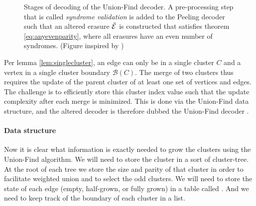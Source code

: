 \begin{figure}[]
  \centering
  \caption{Stages of decoding of the Union-Find decoder. A pre-processing step that is called \emph{syndrome validation} is added to the Peeling decoder such that an altered erasure $\bar{\mathcal{E}}$ is constructed that satisfies theorem \ref{eq:anyevenparity}, where all erasures have an even number of syndromes. (Figure inspired by \cite{delfosse2017almost})} 
  \label{fig:ufstages}
\end{figure}
Per lemma \ref{lem:singlecluster}, an edge can only be in a single cluster $C$ and a vertex in a single cluster boundary $\mathscr{B}(C)$. The merge of two clusters thus requires the update of the parent cluster of at least one set of vertices and edges. The challenge is to efficiently store this cluster index value such that the update complexity after each merge is minimized. This is done via the Union-Find data structure, and the altered decoder is therefore dubbed the Union-Find decoder \cite{delfosse2017almost}.

\paragraph{Data structure}
Now it is clear what information is exactly needed to grow the clusters using the Union-Find algorithm. We will need to store the cluster in a sort of cluster-tree. At the root of each tree we store the size and parity of that cluster in order to facilitate weighted union and to select the odd clusters. We will need to store the state of each edge (empty, half-grown, or fully grown) in a table called . And we need to keep track of the boundary of each cluster in a  list.

